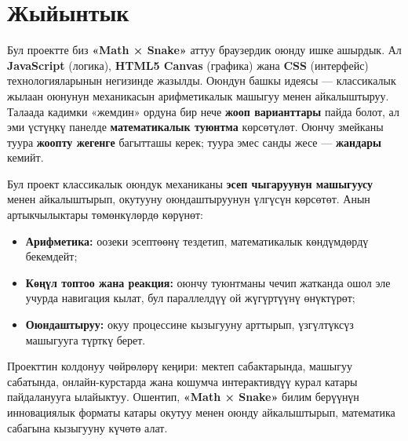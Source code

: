 \documentclass[12pt]{article}
\begin{document}
\section{Жыйынтык}
Бул проектте биз \textbf{«Math × Snake»} аттуу браузердик оюнду ишке ашырдык. Ал \textbf{JavaScript} (логика), \textbf{HTML5 Canvas} (графика) жана \textbf{CSS} (интерфейс) технологияларынын негизинде жазылды.  
Оюндун башкы идеясы — классикалык жылаан оюнунун механикасын арифметикалык машыгуу менен айкалыштыруу. Талаада кадимки «жемдин» ордуна бир нече \textbf{жооп варианттары} пайда болот, ал эми үстүңкү панелде \textbf{математикалык туюнтма} көрсөтүлөт. Оюнчу змейканы туура \textbf{жоопту жегенге} багытташы керек; туура эмес санды жесе — \textbf{жандары} кемийт.

Бул проект классикалык оюндук механиканы \textbf{эсеп чыгаруунун машыгуусу} менен айкалыштырып, окутууну оюндаштыруунун үлгүсүн көрсөтөт. Анын артыкчылыктары төмөнкүлөрдө көрүнөт:
\begin{itemize}
  \item \textbf{Арифметика:} оозеки эсептөөнү тездетип, математикалык көндүмдөрдү бекемдейт;
  \item \textbf{Көңүл топтоо жана реакция:} оюнчу туюнтманы чечип жатканда ошол эле учурда навигация кылат, бул параллелдүү ой жүгүртүүнү өнүктүрөт;
  \item \textbf{Оюндаштыруу:} окуу процессине кызыгууну арттырып, үзгүлтүксүз машыгууга түрткү берет.
\end{itemize}

Проекттин колдонуу чөйрөлөрү кеңири: мектеп сабактарында, машыгуу сабатында, онлайн-курстарда жана кошумча интерактивдүү курал катары пайдаланууга ылайыктуу. Ошентип, \textbf{«Math × Snake»} билим берүүнүн инновациялык форматы катары окутуу менен оюнду айкалыштырып, математика сабагына кызыгууну күчөтө алат.


\end{document}
